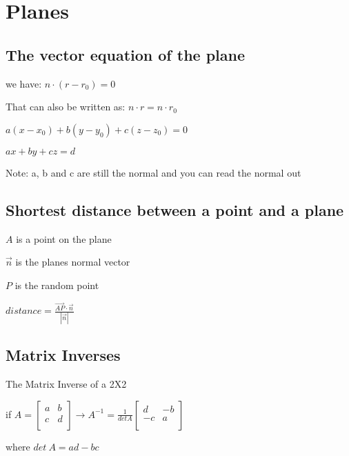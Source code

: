 \documentclass{extarticle}
\begin{document}
\section{Planes}
\subsection{The vector equation of the plane}
we have: $n\cdot\left(r-r_0\right)=0$

That can also be written as: $n\cdot r=n\cdot r_0$

$a\left(x-x_0\right)+b\left(y-y_0\right)+c\left(z-z_0\right)=0$

$ax+by+cz=d$

Note: a, b and c are still the normal and you can read the normal out


\begin{tcolorbox}[enhanced jigsaw,sharp corners,coltext=black,colback=Red!25!white,boxrule=0pt,breakable,size=minimal]
\subsection{Shortest distance between a point and a plane}
$A$ is a point on the plane

$\vec{n}$ is the planes normal vector

$P$ is the random point

$distance=\frac{\vec{AP}\cdot\vec{n}}{\left|\vec{n}\right|}$



\end{tcolorbox}







\subsection{Matrix Inverses}
The Matrix Inverse of a 2X2

if $A=\left[\begin{matrix}a&b\\c&d\\\end{matrix}\right]\rightarrow A^{-1}=\frac{1}{detA}\left[\begin{matrix}d&-b\\-c&a\\\end{matrix}\right]$

where $det\ A=ad-bc$
\end{document}
